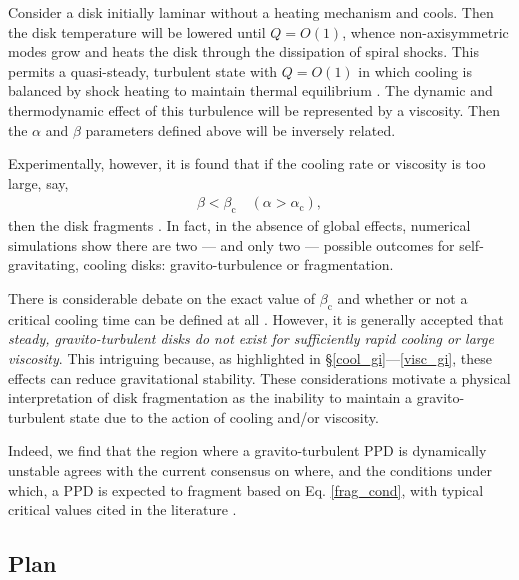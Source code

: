 \documentclass[iop, numberedappendix]{emulateapj}
\begin{document}
Consider a disk initially laminar without a heating mechanism and
cools. Then the disk temperature will be lowered until $Q=O(1)$, whence
non-axisymmetric modes grow and heats the disk through the dissipation
of spiral shocks. %
This permits a quasi-steady, turbulent state with
$Q =O(1)$ in which cooling is balanced by shock heating to maintain
thermal equilibrium \citep{gammie01}. 
The dynamic and thermodynamic effect of this turbulence will be
represented by a viscosity. Then the $\alpha$ and $\beta$ parameters
defined above will be inversely related. 

Experimentally, however, it is found that if the cooling rate or
viscosity is too large, say,   
\begin{align}\label{frag_cond}
  \beta < \beta_\mathrm{c} \quad
  \left(\alpha>\alpha_\mathrm{c}\right), 
\end{align}
then the disk fragments \citep{gammie01,rice05,rice11}. In fact, in
the absence of global effects, numerical simulations show there are
two --- and only two --- possible outcomes for self-gravitating,
cooling disks: gravito-turbulence or fragmentation.  

There is considerable debate on the exact value of $\beta_\mathrm{c}$ 
and whether or not a critical cooling time can be defined at all 
\citep{meru11,lodato11,meru12,paardekooper12,hopkins13}. 
However, it is generally accepted that \emph{steady, gravito-turbulent
  disks do not  
  exist for sufficiently rapid cooling or large viscosity}.  
This intriguing because, as highlighted in
\S\ref{cool_gi}---\ref{visc_gi}, these effects can reduce
gravitational stability. These considerations motivate a physical    
interpretation of disk fragmentation as the inability to maintain a
gravito-turbulent state due to the action of cooling and/or viscosity.

Indeed, we find that the region where a gravito-turbulent PPD is
dynamically unstable agrees with the current consensus on  where, and
the conditions under which, a PPD is expected to fragment based on
Eq. \ref{frag_cond}, with typical critical values cited in the
literature \citep[e.g. $\beta_c\sim
  3,\,\alpha_c\sim0.1$;][]{gammie01,rice05}.    
   

\subsection{Plan}
\end{document}
